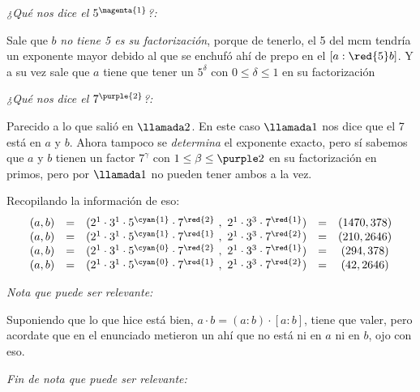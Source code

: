 \bigskip

\textit{¿Qué nos dice el $5^{\magenta{1}}$?:}\par
Sale que $b$ \textit{no tiene 5 es su factorización}, porque de tenerlo, el 5 del mcm tendría un exponente mayor debido al  que se enchufó
ahí de prepo en el $[a:\red{5}b]$. Y a su vez sale que $a$ tiene que tener un $5^\delta$ con $0 \leq \delta \leq 1$ en su factorización

\bigskip

\textit{¿Qué nos dice el $7^{\purple{2}}$?:}\par
Parecido a lo que salió en $\llamada2$. En este caso
$\llamada1$ nos dice que el 7 está en $a$ y $b$. Ahora tampoco se \textit{determina} el exponente exacto, pero sí sabemos
que $a$ y $b$ tienen un factor $7^{\gamma}$ con $1 \leq \beta \leq \purple2$ en su factorización en primos, pero por $\llamada1$ no
pueden tener ambos  a la vez.

\bigskip

Recopilando la información de eso:
$$
  \begin{array}{rcccc}
    (a,b) & = & (2^1 \cdot 3^1 \cdot 5^{\cyan{1}} \cdot 7^{\red{2}}\ ,\  2^1 \cdot 3^3 \cdot 7^{\red{1}} ) & = & (1470,378) \\
    (a,b) & = & (2^1 \cdot 3^1 \cdot 5^{\cyan{1}} \cdot 7^{\red{1}}\ ,\  2^1 \cdot 3^3 \cdot 7^{\red{2}} ) & = & (210,2646) \\
    (a,b) & = & (2^1 \cdot 3^1 \cdot 5^{\cyan{0}} \cdot 7^{\red{2}}\ ,\  2^1 \cdot 3^3 \cdot 7^{\red{1}} ) & = & (294,378)  \\
    (a,b) & = & (2^1 \cdot 3^1 \cdot 5^{\cyan{0}} \cdot 7^{\red{1}}\ ,\  2^1 \cdot 3^3 \cdot 7^{\red{2}} ) & = & (42,2646)  \\
  \end{array}
$$

\textit{Nota que puede ser relevante:}\par
Suponiendo que lo que hice está bien, $a \cdot b = (a:b) \cdot [a:b]$, tiene que valer, pero acordate que
en el enunciado metieron un  ahí que no está ni en $a$ ni en $b$, ojo con eso.\par
\textit{Fin de nota que puede ser relevante:}\par

\begin{aportes}
  \item {}
\end{aportes}

